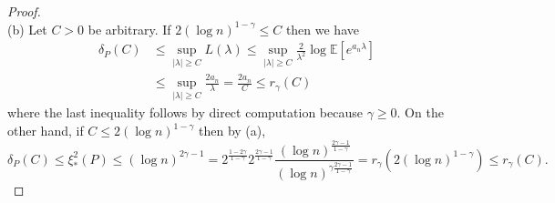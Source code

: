 \documentclass[10pt,a4paper]{amsart}
\newcommand{\E}{\mathbb{E}}
\begin{document}
\begin{proof}
    \\
    (b) Let $C > 0$ be arbitrary. If $2(\log n)^{1 - \gamma} \leq C$ then we have 
    \begin{align*}
        \delta_P(C) &\leq \sup_{|\lambda| \geq C} L(\lambda) \leq \sup_{|\lambda| \geq C} \frac{2}{\lambda^2} \log \E[e^{a_n\lambda}] \\ &\leq \sup_{|\lambda| \geq C}  \frac{2a_n}{\lambda} = \frac{2a_n}{C} \leq r_\gamma(C)
    \end{align*}
    where the last inequality follows by direct computation because $\gamma \geq 0$. 
    On the other hand, if $C \leq 2(\log n)^{1 - \gamma}$ then by (a), 
    \[
    \delta_P(C) \leq \xi_*^2(P) \leq (\log n)^{2\gamma - 1} = 2^{\frac{1 - 2\gamma}{1 - \gamma}}2^{\frac{2\gamma - 1}{1 - \gamma}} \frac{(\log n)^{\frac{2\gamma - 1}{1 - \gamma}}}{(\log n)^{\gamma\frac{2\gamma - 1}{1 - \gamma}}}=r_\gamma(2(\log n)^{1 - \gamma}) \leq r_\gamma(C).
    \]
\end{proof}
\end{document}
